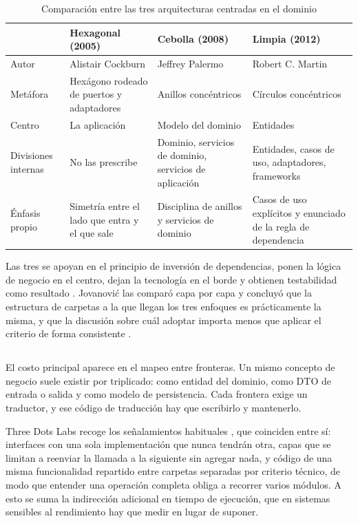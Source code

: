 \documentclass[10pt,a4paper]{article}
\begin{document}
\begin{table}[H]
	\centering
	\begin{tabular}{p{2.4cm} |p{3.8cm} |p{3.8cm} |p{4.2cm}}\hline \hline
		& \textbf{Hexagonal (2005)} & \textbf{Cebolla (2008)} & \textbf{Limpia (2012)} \\ \hline \hline
		Autor & Alistair Cockburn & Jeffrey Palermo & Robert C. Martin \\ \hline
		Metáfora & Hexágono rodeado de puertos y adaptadores & Anillos concéntricos & Círculos concéntricos \\ \hline
		Centro & La aplicación & Modelo del dominio & Entidades \\ \hline
		Divisiones internas & No las prescribe & Dominio, servicios de dominio, servicios de aplicación & Entidades, casos de uso, adaptadores, frameworks \\ \hline
		Énfasis propio & Simetría entre el lado que entra y el que sale & Disciplina de anillos y servicios de dominio & Casos de uso explícitos y enunciado de la regla de dependencia \\ \hline \hline
	\end{tabular}
	\caption{Comparación entre las tres arquitecturas centradas en el dominio}
	\label{tabla:comparacion}
\end{table}

Las tres se apoyan en el principio de inversión de dependencias, ponen la lógica de negocio en el centro, dejan la tecnología en el borde y obtienen testabilidad como resultado \cite{graca2017}. Jovanović las comparó capa por capa y concluyó que la estructura de carpetas a la que llegan los tres enfoques es prácticamente la misma, y que la discusión sobre cuál adoptar importa menos que aplicar el criterio de forma consistente \cite{jovanovic2024}.

\subsection{	\color{colorESCOM}{Costos y críticas}}

El costo principal aparece en el mapeo entre fronteras. Un mismo concepto de negocio suele existir por triplicado: como entidad del dominio, como DTO de entrada o salida y como modelo de persistencia. Cada frontera exige un traductor, y ese código de traducción hay que escribirlo y mantenerlo.

Three Dots Labs recoge los señalamientos habituales \cite{threedots2023}, que coinciden entre sí: interfaces con una sola implementación que nunca tendrán otra, capas que se limitan a reenviar la llamada a la siguiente sin agregar nada, y código de una misma funcionalidad repartido entre carpetas separadas por criterio técnico, de modo que entender una operación completa obliga a recorrer varios módulos. A esto se suma la indirección adicional en tiempo de ejecución, que en sistemas sensibles al rendimiento hay que medir en lugar de suponer.
\end{document}
